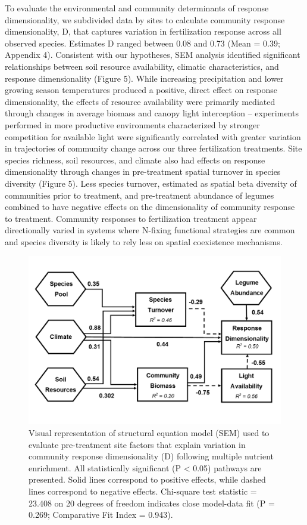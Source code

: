 \documentclass[twoside,12pt,final]{ucthesis-CA2012}
\begin{document}
\begin{ucmainmatter}
To evaluate the environmental and community determinants of response dimensionality, we subdivided data by sites to calculate community response dimensionality, D, that captures variation in fertilization response across all observed species. Estimates D ranged between 0.08 and 0.73 (Mean = 0.39; Appendix 4).
Consistent with our hypotheses, SEM analysis identified significant relationships between soil resource availability, climatic characteristics, and response dimensionality (Figure 5). While increasing precipitation and lower growing season temperatures produced a positive, direct effect on response dimensionality, the effects of resource availability were primarily mediated through changes in average biomass and canopy light interception -- experiments performed in more productive environments characterized by stronger competition for available light were significantly correlated with greater variation in trajectories of community change across our three fertilization treatments.
Site species richness, soil resources, and climate also had effects on response dimensionality through changes in pre-treatment spatial turnover in species diversity (Figure 5). Less species turnover, estimated as spatial beta diversity of communities prior to treatment, and pre-treatment abundance of legumes combined to have negative effects on the dimensionality of community response to treatment. Community responses to fertilization treatment appear directionally varied in systems where N-fixing functional strategies are common and species diversity is likely to rely less on spatial coexistence mechanisms.
\begin{figure}
\centering
\includegraphics[width=\textwidth,height=0.5\textheight]{figure/Fig1_5.png}
\caption{Visual representation of structural equation model (SEM) used to evaluate pre-treatment site factors that explain variation in community response dimensionality (D) following multiple nutrient enrichment. All statistically significant (P \textless{} 0.05) pathways are presented. Solid lines correspond to positive effects, while dashed lines correspond to negative effects. Chi-square test statistic = 23.408 on 20 degrees of freedom indicates close model-data fit (P = 0.269; Comparative Fit Index = 0.943). \label{fig-1-5}}
\end{figure}
\hypertarget{discussion}{%
}
\end{ucmainmatter}
\end{document}
